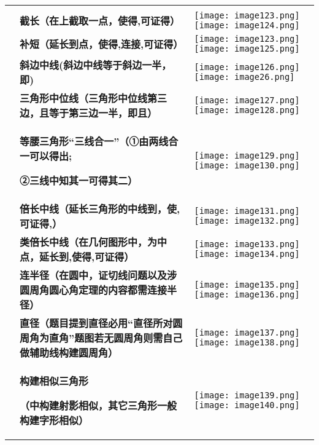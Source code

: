 \begin{longtable}[]{@{}lll@{}}
\toprule
\endhead
& &\tabularnewline
& \textbf{截长（在上截取一点，使得,可证得）} &
\texttt{[image: image123.png]}\texttt{[image: image124.png]}\tabularnewline
& \textbf{补短（延长到点，使得,连接,可证得）} &
\texttt{[image: image123.png]}\texttt{[image: image125.png]}\tabularnewline
& \textbf{斜边中线(斜边中线等于斜边一半，即)} &
\texttt{[image: image126.png]}\texttt{[image: image26.png]}\tabularnewline
& \textbf{三角形中位线（三角形中位线第三边，且等于第三边一半，即且）} &
\texttt{[image: image127.png]}\texttt{[image: image128.png]}\tabularnewline
\begin{minipage}[t]{0.30\columnwidth}\raggedright
\strut
\end{minipage} & \begin{minipage}[t]{0.30\columnwidth}\raggedright
\textbf{等腰三角形``三线合一''（①由两线合一可以得出;}

\textbf{②三线中知其一可得其二）}\strut
\end{minipage} & \begin{minipage}[t]{0.30\columnwidth}\raggedright
\texttt{[image: image129.png]}\texttt{[image: image130.png]}\strut
\end{minipage}\tabularnewline
& \textbf{倍长中线（延长三角形的中线到，使,可证得,）} &
\texttt{[image: image131.png]}\texttt{[image: image132.png]}\tabularnewline
& \textbf{类倍长中线（在几何图形中，为中点，延长到,使得,可证得）} &
\texttt{[image: image133.png]}
\texttt{[image: image134.png]}\tabularnewline
&
\textbf{连半径（在圆中，证切线问题以及涉圆周角圆心角定理的内容都需连接半径）}
&
\texttt{[image: image135.png]}
\texttt{[image: image136.png]}\tabularnewline
&
\textbf{直径（题目提到直径必用``直径所对圆周角为直角''题图若无圆周角则需自己做辅助线构建圆周角）}
&
\texttt{[image: image137.png]}\texttt{[image: image138.png]}\tabularnewline
\begin{minipage}[t]{0.30\columnwidth}\raggedright
\strut
\end{minipage} & \begin{minipage}[t]{0.30\columnwidth}\raggedright
\textbf{构建相似三角形}

\textbf{（中构建射影相似，其它三角形一般构建字形相似）}\strut
\end{minipage} & \begin{minipage}[t]{0.30\columnwidth}\raggedright
\texttt{[image: image139.png]}\texttt{[image: image140.png]}\strut
\end{minipage}\tabularnewline
\bottomrule
\end{longtable}

